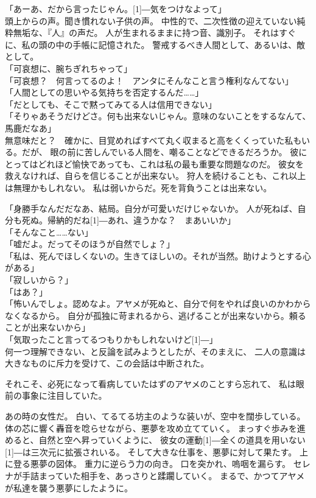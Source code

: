 \documentclass[../IHMain]{subfiles}
\begin{document}
「あーあ、だから言ったじゃん。\scalebox{3}[1]{―}気をつけなよって」\\
頭上からの声。聞き慣れない子供の声。
中性的で、二次性徴の迎えていない純粋無垢な、『人』の声だ。
人が生まれるままに持つ音、識別子。
それはすぐに、私の頭の中の手帳に記憶された。
警戒するべき人間として、あるいは、敵として。\\
「可哀想に、腕ちぎれちゃって」\\
「可哀想？　何言ってるのよ！　アンタにそんなこと言う権利なんてない」\\
「人間としての思いやる気持ちを否定するんだ……」\\
「だとしても、そこで黙ってみてる人は信用できない」\\
「そりゃあそうだけどさ。何も出来ないじゃん。意味のないことをするなんて、馬鹿だなあ」\\
無意味だと？　確かに、目覚めればすべて丸く収まると高をくくっていた私もいる。だが、
眼の前に苦しんでいる人間を、嘲ることなどできるだろうか。
彼にとってはどれほど愉快であっても、これは私の最も重要な問題なのだ。
彼女を救えなければ、自らを信じることが出来ない。
狩人を続けることも、これ以上は無理かもしれない。
私は弱いからだ。死を背負うことは出来ない。

「身勝手なんだだなあ、結局。自分が可愛いだけじゃないか。
人が死ねば、自分も死ぬ。帰納的だね\scalebox{3}[1]{―}あれ、違うかな？　まあいいか」\\
「そんなこと……ない」\\
「嘘だよ。だってそのほうが自然でしょ？」\\
「私は、死んでほしくないの。生きてほしいの。それが当然。助けようとする心がある」\\
「寂しいから？」\\
「はあ？」\\
「怖いんでしょ。認めなよ。アヤメが死ぬと、自分で何をやれば良いのかわからなくなるから。
自分が孤独に苛まれるから、逃げることが出来ないから。頼ることが出来ないから」\\
「気取ったこと言ってるつもりかもしれないけど\scalebox{3}[1]{―}」\\
何一つ理解できない、と反論を試みようとしたが、そのまえに、
二人の意識は大きなものに斥力を受けて、この会話は中断された。

それこそ、必死になって看病していたはずのアヤメのことすら忘れて、
私は眼前の事象に注目していた。

あの時の女性だ。
白い、てるてる坊主のような装いが、空中を闊歩している。
体の芯に響く轟音を唸らせながら、悪夢を攻め立てていく。
まっすぐ歩みを進めると、自然と空へ昇っていくように、
彼女の運動\scalebox{3}[1]{―}全くの道具を用いない\scalebox{3}[1]{―}は三次元に拡張されいる。
そして大きな仕事を、悪夢に対して果たす。
上に登る悪夢の図体。
重力に逆らう力の向き。
口を突かれ、嗚咽を漏らす。
セレナが手詰まっていた相手を、あっさりと蹂躙していく。
まるで、かつてアヤメが私達を襲う悪夢にしたように。
\end{document}
